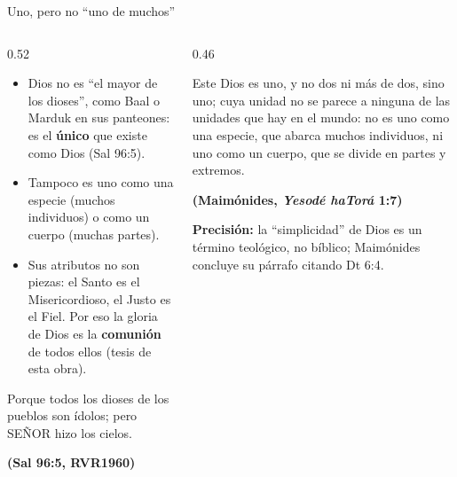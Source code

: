 \documentclass[hyperref={bookmarks=false},aspectratio=169]{beamer}
\newcommand{\SENOR}{S{\fontsize{0.78em}{1em}\selectfont EÑOR}}
\newcommand{\fuente}[1]{\par\hfill{\upshape\bfseries\footnotesize\textcolor{azul}{#1}}}
\newcommand{\destacar}[1]{\textbf{\textcolor{azul}{#1}}}
\newcommand{\precision}[1]{{\footnotesize\color{gris}\textbf{Precisión:} #1}}
\begin{document}
\begin{frame}{Uno, pero no ``uno de muchos''}
\begin{columns}[t,onlytextwidth]
\begin{column}{0.52\textwidth}\small
\begin{itemize}
\item Dios no es ``el mayor de los dioses'', como Baal o Marduk en sus panteones: es el \destacar{único} que existe como Dios (Sal 96:5).
\item Tampoco es uno como una especie (muchos individuos) o como un cuerpo (muchas partes).
\item Sus atributos no son piezas: el Santo es el Misericordioso, el Justo es el Fiel. Por eso la gloria de Dios es la \destacar{comunión} de todos ellos (tesis de esta obra).
\end{itemize}
\begin{cita}[fontupper=\scriptsize\itshape]Porque todos los dioses de los pueblos son ídolos; pero \SENOR{} hizo los cielos.\fuente{(Sal 96:5, RVR1960)}\end{cita}
\end{column}
\begin{column}{0.46\textwidth}
\begin{cita}[colback=dorado!10!papiro,colframe=dorado!80!azul,fontupper=\scriptsize\itshape]Este Dios es uno, y no dos ni más de dos, sino uno; cuya unidad no se parece a ninguna de las unidades que hay en el mundo: no es uno como una especie, que abarca muchos individuos, ni uno como un cuerpo, que se divide en partes y extremos.\fuente{(Maimónides, \emph{Yesodé haTorá} 1:7)}\end{cita}
\precision{la ``simplicidad'' de Dios es un término teológico, no bíblico; Maimónides concluye su párrafo citando Dt 6:4.}
\end{column}
\end{columns}
\end{frame}
\end{document}
